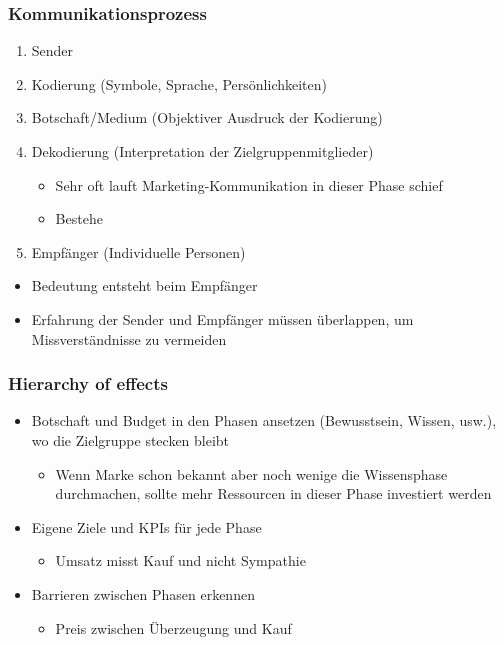 \subsubsection{Kommunikationsprozess}
\begin{enumerate}
    \item Sender
    \item Kodierung (Symbole, Sprache, Persönlichkeiten)
    \item Botschaft/Medium (Objektiver Ausdruck der Kodierung)
    \item Dekodierung (Interpretation der Zielgruppenmitglieder)
    \begin{itemize}
        \item Sehr oft lauft Marketing-Kommunikation in dieser Phase schief 
        \item Bestehe
    \end{itemize}
    \item Empfänger (Individuelle Personen)
\end{enumerate}

\begin{itemize}
    \item Bedeutung entsteht beim Empfänger
    \item Erfahrung der Sender und Empfänger müssen überlappen, um Missverständnisse zu vermeiden
\end{itemize}

\subsubsection{Hierarchy of effects}

\begin{itemize}
    \item Botschaft und Budget in den Phasen ansetzen (Bewusstsein, Wissen, usw.), wo die Zielgruppe stecken bleibt 
    \begin{itemize}
        \item Wenn Marke schon bekannt aber noch wenige die Wissensphase durchmachen, sollte mehr Ressourcen in dieser Phase investiert werden
    \end{itemize}
    \item Eigene Ziele und KPIs für jede Phase
    \begin{itemize}
        \item Umsatz misst Kauf und nicht Sympathie
    \end{itemize}
    \item Barrieren zwischen Phasen erkennen
    \begin{itemize}
        \item Preis zwischen Überzeugung und Kauf
    \end{itemize}
\end{itemize}

